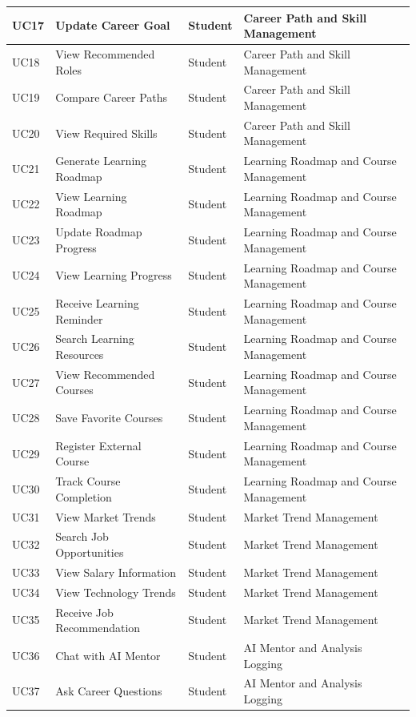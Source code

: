 \begin{longtable}{|>{\centering\arraybackslash}m{0.8cm}|>{\raggedright\arraybackslash}m{3.0cm}|>{\raggedright\arraybackslash}m{2.4cm}|>{\raggedright\arraybackslash}m{4.8cm}|}
\hline
UC17 & Update Career Goal & Student & Career Path and Skill Management \\
\hline
UC18 & View Recommended Roles & Student & Career Path and Skill Management \\
\hline
UC19 & Compare Career Paths & Student & Career Path and Skill Management \\
\hline
UC20 & View Required Skills & Student & Career Path and Skill Management \\
\hline
UC21 & Generate Learning Roadmap & Student & Learning Roadmap and Course Management \\
\hline
UC22 & View Learning Roadmap & Student & Learning Roadmap and Course Management \\
\hline
UC23 & Update Roadmap Progress & Student & Learning Roadmap and Course Management \\
\hline
UC24 & View Learning Progress & Student & Learning Roadmap and Course Management \\
\hline
UC25 & Receive Learning Reminder & Student & Learning Roadmap and Course Management \\
\hline
UC26 & Search Learning Resources & Student & Learning Roadmap and Course Management \\
\hline
UC27 & View Recommended Courses & Student & Learning Roadmap and Course Management \\
\hline
UC28 & Save Favorite Courses & Student & Learning Roadmap and Course Management \\
\hline
UC29 & Register External Course & Student & Learning Roadmap and Course Management \\
\hline
UC30 & Track Course Completion & Student & Learning Roadmap and Course Management \\
\hline
UC31 & View Market Trends & Student & Market Trend Management \\
\hline
UC32 & Search Job Opportunities & Student & Market Trend Management \\
\hline
UC33 & View Salary Information & Student & Market Trend Management \\
\hline
UC34 & View Technology Trends & Student & Market Trend Management \\
\hline
UC35 & Receive Job Recommendation & Student & Market Trend Management \\
\hline
UC36 & Chat with AI Mentor & Student & AI Mentor and Analysis Logging \\
\hline
UC37 & Ask Career Questions & Student & AI Mentor and Analysis Logging \\

\end{longtable}

